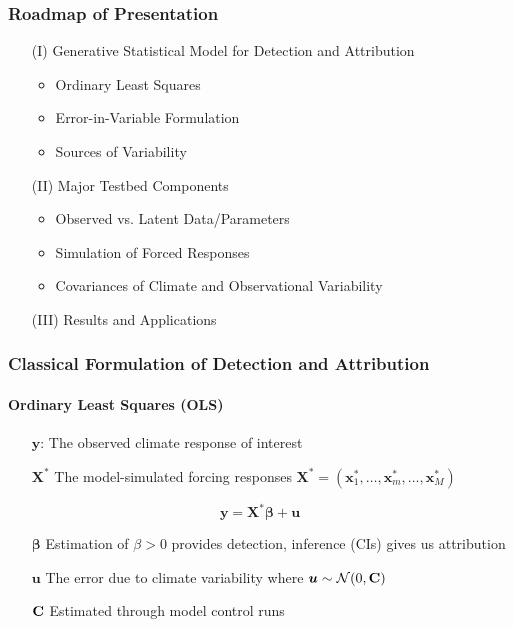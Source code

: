 \documentclass{beamer}
\newcommand{\C}{\ensuremath{\text{Cov}}}
\def\*#1{\bm{#1}}
\def\C{\textbf{\text{C}}}
\begin{document}
\begin{frame}
\frametitle{Roadmap of Presentation}

\begin{itemize}
\item[(I)] Generative Statistical Model for Detection and Attribution
\begin{itemize}
\item Ordinary Least Squares
\item Error-in-Variable Formulation
\item Sources of Variability
\end{itemize}
\item[(II)] Major Testbed Components 
\begin{itemize}
\item Observed vs. Latent Data/Parameters
\item Simulation of Forced Responses
\item Covariances of Climate and Observational Variability
\end{itemize}
\item[(III)] Results and Applications
\end{itemize}
\end{frame}




\begin{frame}
\frametitle{Classical Formulation of Detection and Attribution}
\framesubtitle{Ordinary Least Squares (OLS)}

\begin{itemize}
\item[$\*y$:] The \alert{observed} climate response of interest 
\item[$\*X^*$] The \alert{model-simulated} forcing responses $\*X^* = (\*x^*_1, \dots, \*x^*_m , \dots, \*x^*_M)$
\end{itemize}

\pause

\begin{block}{}
\vspace*{-5pt}\setlength\belowdisplayshortskip{0pt}
\begin{equation*}
\*y = \*X^* \*\beta + \* u
\end{equation*}
\end{block}

\pause
{}
\begin{itemize}
\item[$\*\beta$] Estimation of $\beta >0$ provides detection, inference (CIs) gives us attribution
\end{itemize}

\begin{itemize}
\item[$\*u$] The error due to climate variability where $\*u \sim \mathcal{N}(0, \C)$
\item[$\C$] Estimated through model control runs
\end{itemize}
\end{frame}
\end{document}
